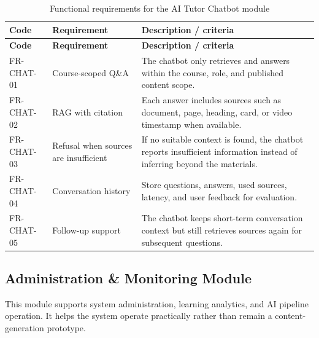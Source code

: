 \begin{longtable}{|p{2.4cm}|p{5.1cm}|p{6.9cm}|}
\caption{Functional requirements for the AI Tutor Chatbot module}
\label{tab:fr-ai-tutor}\\
\hline
\textbf{Code} & \textbf{Requirement} & \textbf{Description / criteria} \\
\hline
\endfirsthead
\hline
\textbf{Code} & \textbf{Requirement} & \textbf{Description / criteria} \\
\hline
\endhead
FR-CHAT-01 & Course-scoped Q\&A & The chatbot only retrieves and answers within the course, role, and published content scope. \\
\hline
FR-CHAT-02 & RAG with citation & Each answer includes sources such as document, page, heading, card, or video timestamp when available. \\
\hline
FR-CHAT-03 & Refusal when sources are insufficient & If no suitable context is found, the chatbot reports insufficient information instead of inferring beyond the materials. \\
\hline
FR-CHAT-04 & Conversation history & Store questions, answers, used sources, latency, and user feedback for evaluation. \\
\hline
FR-CHAT-05 & Follow-up support & The chatbot keeps short-term conversation context but still retrieves sources again for subsequent questions. \\
\hline
\end{longtable}

\subsection{Administration \& Monitoring Module}
\label{subsec:module-quan-tri-theo-doi}

This module supports system administration, learning analytics, and AI pipeline
operation. It helps the system operate practically rather than remain a
content-generation prototype.

